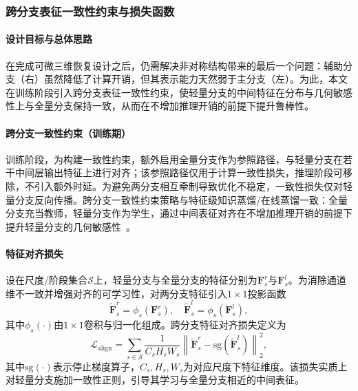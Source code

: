 \subsubsection{跨分支表征一致性约束与损失函数}
\label{subsubsec:align_loss}
\paragraph{设计目标与总体思路}
在完成可微三维恢复设计之后，仍需解决非对称结构带来的最后一个问题：辅助分支（右）虽然降低了计算开销，但其表示能力天然弱于主分支（左）。为此，本文在训练阶段引入跨分支表征一致性约束，使轻量分支的中间特征在分布与几何敏感性上与全量分支保持一致，从而在不增加推理开销的前提下提升鲁棒性。

\paragraph{跨分支一致性约束（训练期）}
训练阶段，为构建一致性约束，额外启用全量分支作为参照路径，与轻量分支在若干中间层输出特征上进行对齐；该参照路径仅用于计算一致性损失，推理阶段可移除，不引入额外时延。为避免两分支相互牵制导致优化不稳定，一致性损失仅对轻量分支反向传播。跨分支一致性约束策略与特征级知识蒸馏/在线蒸馏一致：全量分支充当教师，轻量分支作为学生，通过中间表征对齐在不增加推理开销的前提下提升轻量分支的几何敏感性~。

\paragraph{特征对齐损失}
设在尺度/阶段集合$\mathcal{S}$上，轻量分支与全量分支的特征分别为$\mathbf{F}^{r}_{s}$与$\mathbf{F}^{l}_{s}$。为消除通道维不一致并增强对齐的可学习性，对两分支特征引入$1\times1$投影函数
\begin{equation}
\tilde{\mathbf{F}}^{r}_{s}=\phi_{s}(\mathbf{F}^{r}_{s}),\quad
\tilde{\mathbf{F}}^{l}_{s}=\phi_{s}(\mathbf{F}^{l}_{s}),
\label{eq:align_proj}
\end{equation}
其中$\phi_s(\cdot)$由$1\times1$卷积与归一化组成。跨分支特征对齐损失定义为
\begin{equation}
\mathcal{L}_{\text{align}}
=
\sum_{s\in\mathcal{S}}
\frac{1}{C_s H_s W_s}
\left\|
\tilde{\mathbf{F}}^{r}_{s}
-
\mathrm{sg}\!\left(\tilde{\mathbf{F}}^{l}_{s}\right)
\right\|_2^2,
\label{eq:loss_align}
\end{equation}
其中$\mathrm{sg}(\cdot)$表示停止梯度算子，$C_s,H_s,W_s$为对应尺度下特征维度。该损失实质上对轻量分支施加一致性正则，引导其学习与全量分支相近的中间表征。

